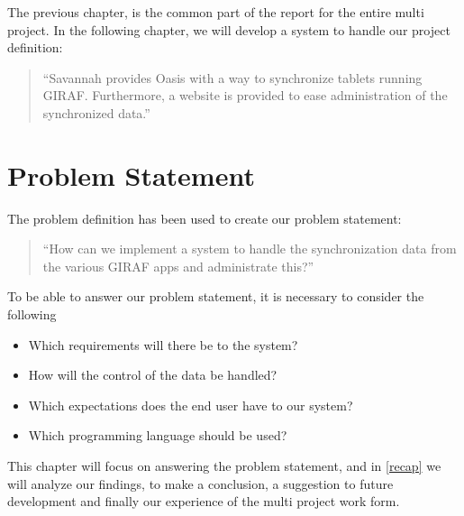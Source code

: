 The previous chapter, is the common part of the report for the entire multi project. In the following chapter, we will develop a system to handle our project definition:
\begin{quotation}
``Savannah provides Oasis with a way to synchronize tablets running GIRAF. Furthermore, a website is provided to ease administration of the synchronized data.''
\end{quotation}

\section{Problem Statement}
The problem definition has been used to create our problem statement:
\begin{quotation}
``How can we implement a system to handle the synchronization data from the various GIRAF apps and administrate this?''
\end{quotation}

To be able to answer our problem statement, it is necessary to consider the following
\begin{itemize}
	\item Which requirements will there be to the system?
	\item How will the control of the data be handled?
	\item Which expectations does the end user have to our system?
	\item Which programming language should be used?
\end{itemize}

This chapter will focus on answering the problem statement, and in \autoref{recap} we will analyze our findings, to make a conclusion, a suggestion to future development and finally our experience of the multi project work form.